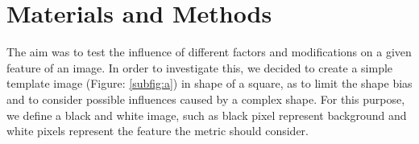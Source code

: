 \documentclass[journal]{IEEEtran}
\begin{document}
%




\section{Materials and Methods}
\label{Materials and Methods}

The aim was to test the influence of different factors and modifications on a given feature of an image. In order to investigate this, we decided to create a simple template image (Figure: \ref{subfig:a}) in shape of a square, as to limit the shape bias and to consider possible influences caused by a complex shape. For this purpose, we define a black and white image, such as black pixel represent background and white pixels represent the feature the metric should consider.
\end{document}
